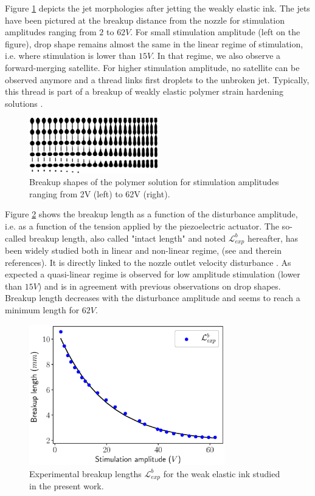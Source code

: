\documentclass[twocolumn,10pt]{asme2ej}
\begin{document}
Figure \ref{fig:expAll} depicts the jet morphologies after jetting the weakly elastic ink. The jets have been pictured at the breakup distance from the nozzle for stimulation amplitudes ranging from $2$ to $62V$. 
For small stimulation amplitude (left on the figure), drop shape remains almost the same in the linear regime of stimulation, i.e. where stimulation is lower than $15V$. In that regime, we also observe a forward-merging satellite. For higher stimulation amplitude, no satellite can be observed anymore and a thread links first droplets to the unbroken jet. Typically, this thread is part of a breakup of weakly elastic polymer strain hardening solutions \cite{christanti2002effect}.

\begin{figure}[h]
    \centering
    \includegraphics[width=0.5\textwidth]{Encre/expAll.png}
    \caption{Breakup shapes of the polymer solution for stimulation amplitudes ranging from 2V (left) to 62V (right).} 
    \label{fig:expAll}
\end{figure}
Figure \ref{fig:LbInk} shows the breakup length as a function of the disturbance amplitude, i.e. as a function of the tension applied by the piezoelectric actuator. The so-called breakup length, also called "intact length" and noted $\mathcal{L}^b_{exp}$ hereafter, has been widely studied both in linear and non-linear regime, (see \cite{eggers2008physics} and therein references). It is directly linked to the nozzle outlet velocity disturbance \cite{pimbley1977satellite,rosello2018influence}. As expected a quasi-linear regime is observed for low  amplitude stimulation (lower than $15V$) and is in agreement with previous observations on drop shapes. Breakup length decreases with the disturbance amplitude and seems to reach a minimum length for $62V$.

\begin{figure}[h]
    \centering
    \includegraphics[width=8.5cm]{LbInk.eps}
    \caption{Experimental breakup lengths $\mathcal{L}^b_{exp}$ for the weak elastic ink studied in the present work.}
    \label{fig:LbInk}
\end{figure}
\end{document}
